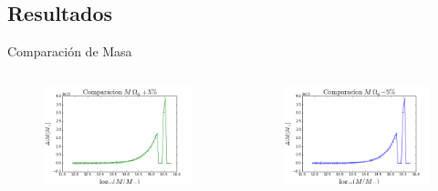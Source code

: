 \documentclass{beamer}
\begin{document}
\subsection{Resultados}
\begin{frame}{Comparación de Masa}
	\begin{columns}
		\begin{column}{0.5\textwidth}
			\begin{figure}[!h]
			\begin{center}
				\includegraphics[width=\textwidth]{im/logm-deltam-mas}
				\label{fig:m1}
			\end{center}
		\end{figure}
		\end{column}
		
		\begin{column}{0.5\textwidth}
			\begin{figure}[!h]
			\begin{center}
				\includegraphics[width=\textwidth]{im/logm-deltam-menos}
				\label{fig:m2}
			\end{center}
		\end{figure}
		\end{column}
	\end{columns}
\end{frame}
\end{document}
